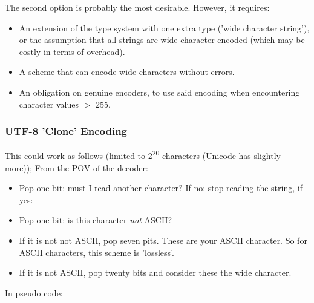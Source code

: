 The second option is probably the most desirable. However, it requires:

\begin{itemize}
\item An extension of the type system with one extra type
      ('wide character string'), or the assumption that all strings are
      wide character encoded (which may be costly in terms of overhead).
\item A scheme that can encode wide characters without errors.
\item An obligation on genuine encoders, to use said encoding when
      encountering character values $>$ 255.
\end{itemize}

\subsubsection{UTF-8 'Clone' Encoding}

This could work as follows
(limited to 2\textsuperscript{20} characters (Unicode has slightly more));
From the POV of the decoder:

\begin{itemize}
\item Pop one bit: must I read another character?
      If no: stop reading the string, if yes:
\item Pop one bit: is this character \textit{not} ASCII?
\item If it is not not ASCII, pop seven pits. These are your ASCII character.
      So for ASCII characters, this scheme is 'lossless'.
\item If it is not ASCII, pop twenty bits and consider these the wide character.
\end{itemize}

In pseudo code:

